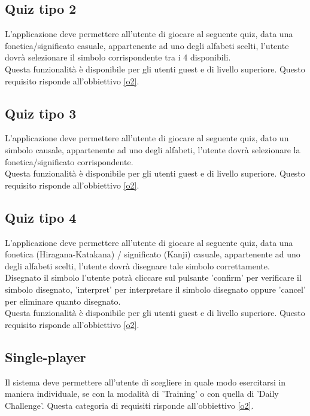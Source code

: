 \subsection{Quiz tipo 2} \label{req_quiz_2}
L'applicazione deve permettere all'utente di giocare al seguente quiz, data una fonetica/significato casuale, appartenente ad uno degli alfabeti scelti, l'utente dovrà selezionare il simbolo corrispondente tra i 4 disponibili. \\ 
Questa funzionalità è disponibile per gli utenti guest e di livello superiore. Questo requisito risponde all'obbiettivo \ref{o2}.

\subsection{Quiz tipo 3} \label{req_quiz_3}
L'applicazione deve permettere all'utente di giocare al seguente quiz, dato un simbolo causale, appartenente ad uno degli alfabeti, l'utente dovrà selezionare la fonetica/significato corrispondente. \\
Questa funzionalità è disponibile per gli utenti guest e di livello superiore. Questo requisito risponde all'obbiettivo \ref{o2}.

\subsection{Quiz tipo 4} \label{req_quiz_4}
L'applicazione deve permettere all'utente di giocare al seguente quiz, data una fonetica (Hiragana-Katakana) / significato (Kanji) casuale, appartenente ad uno degli alfabeti scelti, l'utente dovrà disegnare tale simbolo correttamente. Disegnato il simbolo l'utente potrà cliccare sul pulsante 'confirm' per verificare il simbolo disegnato, 'interpret' per interpretare il simbolo disegnato oppure 'cancel' per eliminare quanto disegnato. \\
Questa funzionalità è disponibile per gli utenti guest e di livello superiore. Questo requisito risponde all'obbiettivo \ref{o2}.

\subsection{Single-player} \label{req_scegli_modalità_single_player}
Il sistema deve permettere all'utente di scegliere in quale modo esercitarsi in maniera individuale, se con la modalità di 'Training' o con quella di 'Daily Challenge'. Questa categoria di requisiti risponde all'obbiettivo \ref{o2}.

